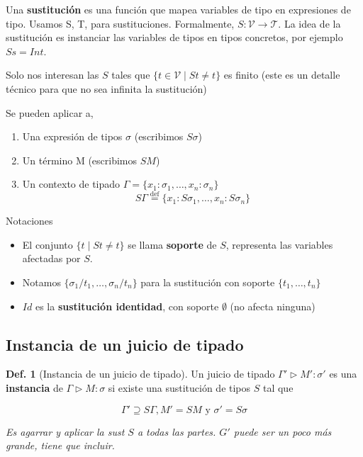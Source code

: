 \documentclass{report}
\theoremstyle{definition} %
\newtheorem{definition}{Def.}[chapter]
\newcommand{\eqdef}{\overset{\text{def}}{=}}
\newcommand{\tfunc}[2]{#1 \to #2}
\newcommand{\tipa}[3]{#1 \rhd #2 : #3} %
\newcommand{\Gtipa}[2]{\tipa{\Gamma}{#1}{#2}}
\newcommand{\typeVars}{\mathcal{V}}
\newcommand{\types}{\mathcal{T}}
\newcommand{\tsust}[1]{S#1} %
\newcommand{\sustfor}[2]{#1/#2} %
\newcommand{\GTipaInst}[2]{\tipa{\Gamma'}{#1'}{#2'}} %
\begin{document}
Una \textbf{sustitución} es una función que mapea variables de tipo en
expresiones de tipo. Usamos S, T, para sustituciones. Formalmente,
$S : \tfunc{\typeVars}{\types}$. La idea de la sustitución es instanciar las
variables de tipos en tipos concretos, por ejemplo $\tsust{s} = Int$.

Solo nos interesan las $S$ tales que $\{ t \in \typeVars \mid St \neq t \}$ es
finito (este es un detalle técnico para que no sea infinita la sustitución)

Se pueden aplicar a,

\begin{enumerate}
    \item Una expresión de tipos $\sigma$ (escribimos $\tsust{\sigma}$)
    \item Un término M (escribimos $\tsust{M}$)
    \item Un contexto de tipado
    $\Gamma = \{ x_1 : \sigma_1, \dots, x_n : \sigma_n\}$
    \[
        \tsust{\Gamma} \eqdef
        \{
            x_1 : \tsust{\sigma_1}, 
            \dots,
            x_n : \tsust{\sigma_n}
        \}
    \]
\end{enumerate}

Notaciones

\begin{itemize}
    \item El conjunto $\{ t \mid \tsust{t} \neq t \}$ se llama \textbf{soporte}
    de $S$, representa las variables afectadas por $S$.
    \item Notamos $\{ \sustfor{\sigma_1}{t_1}, \dots, \sustfor{\sigma_n}{t_n} \}$
    para la sustitución con soporte $\{t_1, \dots, t_n \}$
    \item $Id$ es la \textbf{sustitución identidad}, con soporte $\emptyset$ (no
    afecta ninguna)
\end{itemize}

\subsection{Instancia de un juicio de tipado}

\begin{definition}[Instancia de un juicio de tipado]
    Un juicio de tipado $\GTipaInst{M}{\sigma}$ es una \textbf{instancia} de
    $\Gtipa{M}{\sigma}$ si existe una sustitución de tipos $S$ tal que

    \[
        \Gamma' \supseteq \tsust{\Gamma},
        M' = \tsust{M}
        \text{ y }
        \sigma' = \tsust{\sigma}
    \]

    \textit{Es agarrar y aplicar la sust $S$ a todas las partes. $G'$ puede ser un poco más grande, tiene que incluir.}
\end{definition}
\end{document}

